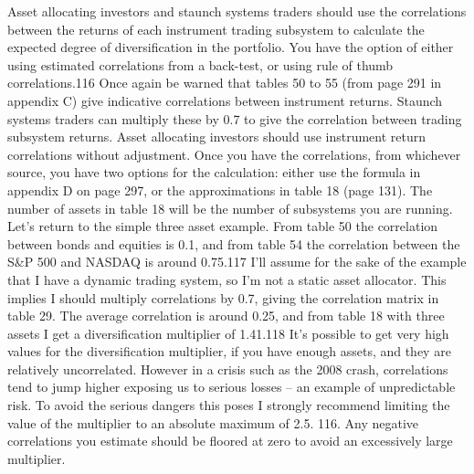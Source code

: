 
\begin{englishblock} Asset allocating investors and staunch systems traders should use the correlations between the returns of each instrument trading subsystem to calculate the expected degree of diversification in the portfolio. You have the option of either using estimated correlations from a back-test, or using rule of thumb correlations.116 Once again be warned that tables 50 to 55 (from page 291 in appendix C) give indicative correlations between instrument returns. Staunch systems traders can multiply these by 0.7 to give the correlation between trading subsystem returns. Asset allocating investors should use instrument return correlations without adjustment. Once you have the correlations, from whichever source, you have two options for the calculation: either use the formula in appendix D on page 297, or the approximations in table 18 (page 131). The number of assets in table 18 will be the number of subsystems you are running. Let's return to the simple three asset example. From table 50 the correlation between bonds and equities is 0.1, and from table 54 the correlation between the S\&P 500 and NASDAQ is around 0.75.117 I'll assume for the sake of the example that I have a dynamic trading system, so I'm not a static asset allocator. This implies I should multiply correlations by 0.7, giving the correlation matrix in table 29. The average correlation is around 0.25, and from table 18 with three assets I get a diversification multiplier of 1.41.118 It's possible to get very high values for the diversification multiplier, if you have enough assets, and they are relatively uncorrelated. However in a crisis such as the 2008 crash, correlations tend to jump higher exposing us to serious losses -- an example of unpredictable risk. To avoid the serious dangers this poses I strongly recommend limiting the value of the multiplier to an absolute maximum of 2.5. 116. Any negative correlations you estimate should be floored at zero to avoid an excessively large multiplier. \end{englishblock}

